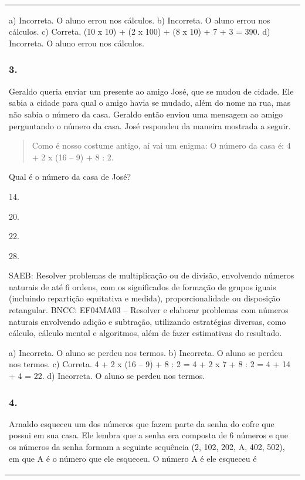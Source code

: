 \begin{mdframed}[linewidth=2pt,linecolor=salmao,roundcorner=2pt]
\begin{escolha}
{{{\begin{longtable}[]{@{}l@{}}
\begin{itemize}
{a) Incorreta. O aluno errou nos cálculos.
b) Incorreta. O aluno errou nos cálculos.
c) Correta. (10 x 10) + (2 x 100) + (8 x 10) + 7 + 3 = 390.
d) Incorreta. O aluno errou nos cálculos.

\subsubsection{3. }

Geraldo queria enviar um presente ao amigo José, que se mudou de cidade. Ele
sabia a cidade para qual o amigo havia se mudado, além do nome na rua, mas
não sabia o número da casa. Geraldo então enviou uma mensagem ao
amigo perguntando o número da casa. José respondeu da maneira mostrada a seguir.

\begin{quote}
Como é nosso costume antigo, aí vai um enigma:
O número da casa é: 4 + 2 x (16 -- 9) + 8 : 2.
\end{quote}

Qual é o número da casa de José?

\begin{escolha}
\item
  14.
\item
  20.
\item
  22.
\item
  28.
\end{escolha}

SAEB: Resolver problemas de multiplicação ou de divisão, envolvendo números
naturais de até 6 ordens, com os significados de formação de grupos
iguais (incluindo repartição equitativa e medida), proporcionalidade ou
disposição retangular.
BNCC: EF04MA03 -- Resolver e elaborar problemas com números naturais envolvendo adição e subtração,
utilizando estratégias diversas, como cálculo, cálculo mental e algoritmos, além de fazer estimativas
do resultado.

a) Incorreta. O aluno se perdeu nos termos.
b) Incorreta. O aluno se perdeu nos termos.
c) Correta. 4 + 2 x (16 -- 9) + 8 : 2 = 4 + 2 x 7 + 8 : 2 = 4 + 14 + 4 = 22.
d) Incorreta. O aluno se perdeu nos termos.

\subsubsection{4. }

Arnaldo esqueceu um dos números que fazem parte da senha do cofre que
possui em sua casa. Ele lembra que a senha era composta de 6 números e
que os números da senha formam a seguinte sequência (2, 102, 202,
A, 402, 502), em que A é o número que ele esqueceu. O número A é
ele esqueceu é

}
\end{itemize}
\end{longtable}}}}
\end{escolha}
\end{mdframed}
